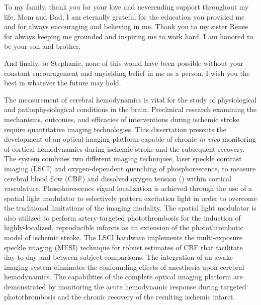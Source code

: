 \documentclass[12pt]{report}
\begin{document}
\begin{acknowledgments}
To my family, thank you for your love and neverending support throughout my life. Mom and Dad, I am eternally grateful for the education you provided me and for always encouraging and believing in me. Thank you to my sister Renee for always keeping me grounded and inspiring me to work hard. I am honored to be your son and brother.

And finally, to Stephanie, none of this would have been possible without your constant encouragement and unyielding belief in me as a person. I wish you the best in whatever the future may hold.

\end{acknowledgments}


\utabstract
\indent The measurement of cerebral hemodynamics is vital for the study of physiological and pathophysiological conditions in the brain. Preclinical research examining the mechanisms, outcomes, and efficacies of interventions during ischemic stroke require quantitative imaging technologies. This dissertation presents the development of an optical imaging platform capable of chronic \textit{in vivo} monitoring of cortical hemodynamics during ischemic stroke and the subsequent recovery. The system combines two different imaging techniques, laser speckle contrast imaging (LSCI) and oxygen-dependent quenching of phosphorescence, to measure cerebral blood flow (CBF) and dissolved oxygen tension () within cortical vasculature. Phosphorescence signal localization is achieved through the use of a spatial light modulator to selectively pattern excitation light in order to overcome the traditional limitations of the imaging modality. The spatial light modulator is also utilized to perform artery-targeted photothrombosis for the induction of highly-localized, reproducible infarcts as an extension of the photothrombotic model of ischemic stroke. The LSCI hardware implements the multi-exposure speckle imaging (MESI) technique for robust estimates of CBF that facilitate day-to-day and between-subject comparisons. The integration of an awake imaging system eliminates the confounding effects of anesthesia upon cerebral hemodynamics. The capabilities of the complete optical imaging platform are demonstrated by monitoring the acute hemodynamic response during targeted photothrombosis and the chronic recovery of the resulting ischemic infarct.

\tableofcontents
\listoftables
\listoffigures
\end{document}
